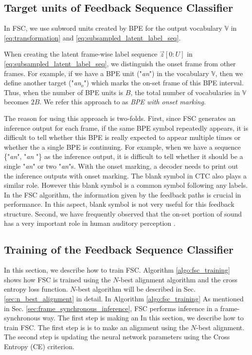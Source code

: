 \documentclass{article}
\begin{document}
\subsection{Target units of Feedback Sequence Classifier}
\label{sec:target_units}

In FSC, we use subword units created by BPE \cite{r_sennrich_acl_2016_00} for
the output vocabulary $\mathbb{V}$ in 
\eqref{eq:transformation} and \eqref{eq:subsampled_latent_label_seq}. 

When creating the latent frame-wise label sequence $\vec{z}[0:U]$ 
in \eqref{eq:subsampled_latent_label_seq}, we distinguish the onset frame
from other frames.  For example, if we have a BPE unit
("{\it an}") in the vocabulary $\mathbb{V}$, then we define another
target ("{\it an$_o$}") which marks the on-set frame of this BPE
interval. Thus, when the number of BPE units is $B$, the total
number of vocabularies in $\mathbb{V}$ becomes $2B$.
We refer this approach to as {\it BPE with onset marking}.

The reason for using this approach is two-folds. First, since FSC
generates an inference output for each frame, if the same
BPE symbol repeatedly appears, it is difficult to tell whether 
this BPE is really expected to appear multiple times or whether 
the a single BPE is continuing. For example, when we have 
a sequence \{"{\it an}", "{\it an} "\}
as the inference output, it is difficult to tell whether it should be a single
"{\it an}" or two "{\it an}"s. With the onset marking,
a decoder needs to print out the inference outputs with onset marking. 
The blank symbol in CTC also plays a similar role. However this blank symbol
is a common symbol following any labels. In the FSC algorithm, the information
given by the feedback paths is crucial in performance. In this aspect,
blank symbol is not very useful for this feedback structure. 
Second, we have frequently observed that the on-set portion of sound
has a very important role in human auditory perception 
\cite{C_Kim_INTERSPEECH_2014_2}.











\subsection{Training of the Feedback Sequence Classifier}
In this section, we describe how to train FSC.  Algorithm 
\ref{algo:fsc_training} shows how FSC is trained using the 
$N$-best alignment algorithm and the cross entropy loss function. 
$N$-best algorithm will be described 
in Sec. \ref{sec:n_best_alignment} in detail.
In Algorithm \ref{algo:fsc_training}  
As mentioned in Sec. 
\ref{sec:frame_synchronous_inference}, FSC performs inference
in a frame-synchronous way.
The first step is making an 
In this section, we describe how to train FSC. The first step is 
is to make an alignment using the $N$-best alignment. The second step is updating the
neural network parameters using the Cross Entropy (CE) criterion. 
\end{document}
